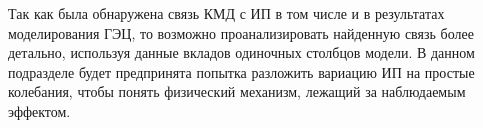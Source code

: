 \label{subsec:2-6}

Так как была обнаружена связь КМД с ИП в том числе и в результатах моделирования ГЭЦ, то возможно проанализировать найденную связь более детально, используя данные вкладов одиночных столбцов модели. В данном подразделе будет предпринята попытка разложить вариацию ИП на простые колебания, чтобы понять физический механизм, лежащий за наблюдаемым эффектом.